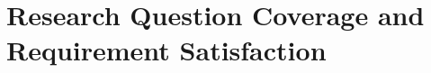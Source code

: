 \section{Research Question Coverage and Requirement Satisfaction} %
  \label{Research Question Coverage and Requirement Satisfaction} %


\todo






